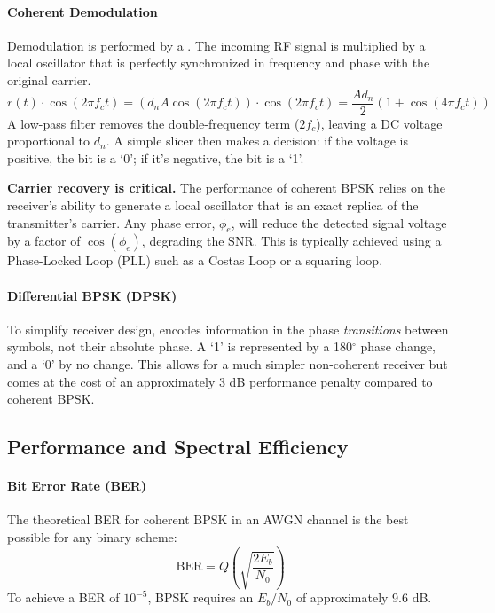 \paragraph{Coherent Demodulation}
Demodulation is performed by a . The incoming RF signal is multiplied by a local oscillator that is perfectly synchronized in frequency and phase with the original carrier.
\begin{equation}
    r(t) \cdot \cos(2\pi f_c t) = (d_n A \cos(2\pi f_c t)) \cdot \cos(2\pi f_c t) = \frac{A d_n}{2} (1 + \cos(4\pi f_c t))
\end{equation}
A low-pass filter removes the double-frequency term ($2f_c$), leaving a DC voltage proportional to $d_n$. A simple slicer then makes a decision: if the voltage is positive, the bit is a `0'; if it's negative, the bit is a `1'.

\begin{warningbox}
    \textbf{Carrier recovery is critical.} The performance of coherent BPSK relies on the receiver's ability to generate a local oscillator that is an exact replica of the transmitter's carrier. Any phase error, $\phi_e$, will reduce the detected signal voltage by a factor of $\cos(\phi_e)$, degrading the SNR. This is typically achieved using a Phase-Locked Loop (PLL) such as a Costas Loop or a squaring loop.
\end{warningbox}

\paragraph{Differential BPSK (DPSK)}
To simplify receiver design,  encodes information in the phase \emph{transitions} between symbols, not their absolute phase. A `1' is represented by a 180$^\circ$ phase change, and a `0' by no change. This allows for a much simpler non-coherent receiver but comes at the cost of an approximately 3 dB performance penalty compared to coherent BPSK.


\subsection{Performance and Spectral Efficiency}

\paragraph{Bit Error Rate (BER)}
The theoretical BER for coherent BPSK in an AWGN channel is the best possible for any binary scheme:
\begin{equation}
    \text{BER} = Q\left(\sqrt{\frac{2E_b}{N_0}}\right)
\end{equation}
To achieve a BER of $10^{-5}$, BPSK requires an $E_b/N_0$ of approximately 9.6 dB.

